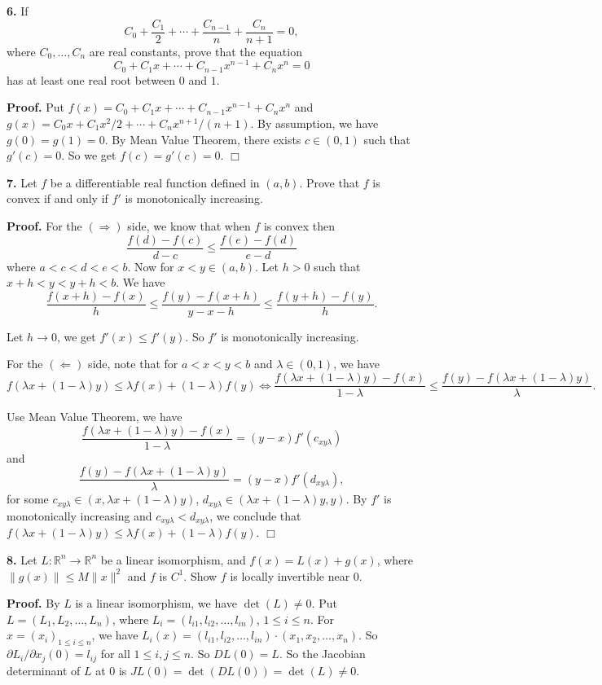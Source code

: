 \documentclass{article}
\begin{document}
    \textbf{6.} If
\[C_0 + \frac{C_1}{2} + \cdots + \frac{C_{n-1}}{n} + \frac{C_n}{n+1} = 0,\]
where $C_0,\ldots,C_n$ are real constants, prove that the equation
\[C_0 + C_1x + \cdots + C_{n-1} x^{n-1} + C_nx^n = 0\] has at least one
real root between $0$ and $1$.

    \textbf{Proof.} Put
$f(x) = C_0 + C_1x + \cdots + C_{n-1} x^{n-1} + C_nx^n$ and
$g(x) = C_0 x + C_1 x^2/2 + \cdots + C_nx^{n+1}/(n+1)$. By assumption,
we have $g(0) = g(1) = 0$. By Mean Value Theorem, there exists
$c\in (0,1)$ such that $g'(c) = 0$. So we get $f(c) =g'(c)= 0$. $\Box$

    \textbf{7.} Let $f$ be a differentiable real function defined in
$(a,b)$. Prove that $f$ is convex if and only if $f'$ is monotonically
increasing.

    \textbf{Proof.} For the $(\Rightarrow)$ side, we know that when $f$ is
convex then \[\frac{f(d) - f(c)}{d-c} \le \frac{f(e)-f(d)}{e-d}\] where
$a < c < d < e < b$. Now for $x< y \in (a,b)$. Let $h > 0$ such that
$x + h < y < y+h < b$. We have
\[\frac{f(x+h) - f(x)}{h} \le \frac{f(y)-f(x+h)}{y -x-h} \le \frac{f(y+h)-f(y)}{h}.\]

Let $h \to 0$, we get $f'(x) \le f'(y)$. So $f'$ is monotonically
increasing.

For the $(\Leftarrow)$ side, note that for $a < x < y < b$ and
$\lambda \in (0,1)$, we have
\[f(\lambda x + (1-\lambda)y) \le \lambda f(x) + (1-\lambda) f(y) \iff \frac{f(\lambda x + (1-\lambda)y) - f(x)}{1-\lambda} \le \frac{f(y) -f(\lambda x + (1-\lambda)y) }{\lambda}.\]

Use Mean Value Theorem, we have
\[\frac{f(\lambda x + (1-\lambda)y) - f(x)}{1-\lambda} = (y-x) f'(c_{xy\lambda})\]
and
\[\frac{f(y) -f(\lambda x + (1-\lambda)y) }{\lambda} = (y -x) f'(d_{xy\lambda}),\]
for some $c_{xy\lambda} \in (x, \lambda x + (1-\lambda)y)$,
$d_{xy\lambda} \in (\lambda x + (1-\lambda)y, y)$. By $f'$ is
monotonically increasing and $c_{xy\lambda}<d_{xy\lambda}$, we conclude
that $f(\lambda x + (1-\lambda)y) \le \lambda f(x) + (1-\lambda) f(y)$.
$\Box$

    \textbf{8.} Let $L:\mathbb{R}^n \to \mathbb{R}^n$ be a linear
isomorphism, and $f(x) = L(x) + g(x)$, where $\|g(x)\| \le M \|x\|^2$
and $f$ is $C^1$. Show $f$ is locally invertible near $0$.

    \textbf{Proof.} By $L$ is a linear isomorphism, we have
$\det (L) \ne 0$. Put $L = (L_1, L_2,\ldots,L_n)$, where
$L_i = (l_{i1},l_{i2},\ldots,l_{in})$, $1\le i \le n$. For
$x = (x_i)_{1\le i \le n}$, we have
$L_i(x) =  (l_{i1},l_{i2},\ldots,l_{in})\cdot (x_1,x_2,\ldots,x_n)$. So
$\partial L_i /\partial x_j(0) = l_{ij}$ for all $1\le i , j\le n$. So
$DL(0) = L$. So the Jacobian determinant of $L$ at $0$ is
$JL(0) = \det(DL(0)) = \det(L) \ne 0$.
\end{document}
